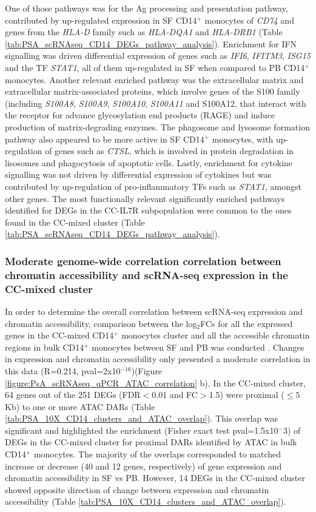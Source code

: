 One of those pathways was for the Ag processing and presentation pathway, contributed by up-regulated expression in SF CD14$^+$ monocytes of \textit{CD74} and genes from the \textit{HLA-D} family such as \textit{HLA-DQA1} and \textit{HLA-DRB1} (Table \ref{tab:PSA_scRNAseq_CD14_DEGs_pathway_analysis}). Enrichment for IFN signalling was driven differential expression of genes such as \textit{IFI6}, \textit{IFITM3}, \textit{ISG15} and the TF \textit{STAT1}, all of them up-regulated in SF when compared to PB CD14$^+$ monocytes. Another relevant enriched pathway was the extracellular matrix and extracellular matrix-associated proteins, which involve genes of the S100 family (including \textit{S100A8}, \textit{S100A9}, \textit{S100A10}, \textit{S100A11} and S100A12, that interact with the receptor for advance glycosylation end products (RAGE) and induce production of matrix-degrading enzymes. The phagosome and lysosome formation pathway also appeared to be more active in SF CD14$^+$ monocytes, with up-regulation of genes such as \textit{CTSL}, which is involved in protein degradation in lisosomes and phagocytosis of apoptotic cells. Lastly, enrichment for cytokine signalling was not driven by differential expression of cytokines but was contributed by up-regulation of pro-inflammatory TFs such as \textit{STAT1}, amongst other genes. The most functionally relevant significantly enriched pathways identified for DEGs in the CC-IL7R subpopulation were common to the ones found in the CC-mixed cluster (Table \ref{tab:PSA_scRNAseq_CD14_DEGs_pathway_analysis}).



\subsubsection{Moderate genome-wide correlation correlation between chromatin accessibility and scRNA-seq expression in the CC-mixed cluster}
In order to determine the overall correlation between scRNA-seq expression and chromatin accessibility, comparison between the log$_2$FCs for all the expressed genes in the CC-mixed CD14$^+$ monocytes cluster and all the accessible chromatin regions in bulk CD14$^+$ monocytes between SF and PB was conducted . Changes in expression and chromatin accessibility only presented a moderate correlation in this data (R=0.214, pval=2x10$^{-16}$)(Figure \ref{figure:PsA_scRNAseq_qPCR_ATAC_correlation} b). In the CC-mixed cluster, 64 genes out of the 251 DEGs (FDR$<$0.01 and FC$>$1.5) were proximal ($\leq5$Kb) to one or more ATAC DARs (Table \ref{tab:PSA_10X_CD14_clusters_and_ATAC_overlap}). This overlap was significant and highlighted the enrichment (Fisher exact test pval=1.5x10$^-3$) of DEGs in the CC-mixed cluster for proximal DARs identified by ATAC in bulk CD14$^+$ monocytes. The majority of the overlaps corresponded to matched increase or decrease (40 and 12 genes, respectively) of gene expression and chromatin accessibility in SF vs PB. However, 14 DEGs in the CC-mixed cluster showed opposite direction of change between expression and chromatin accessibility (Table \ref{tab:PSA_10X_CD14_clusters_and_ATAC_overlap}). 


